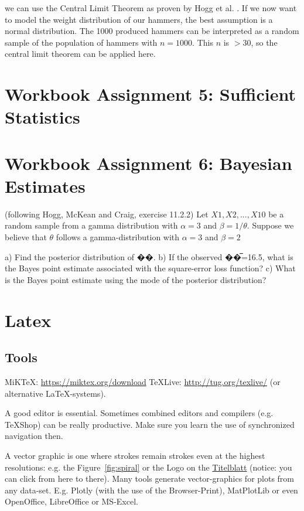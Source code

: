 we can use the Central Limit Theorem as proven by Hogg et al. \cite[Theorem~5.3.1]{hogg}. 
If we now want to model the weight distribution of our hammers, the best assumption is a normal distribution. The 1000 produced hammers can be interpreted as a random sample of the population of hammers with $n = 1000$. This $n$ is $>30$, so the central limit theorem can be applied here. 



\chapter{Workbook Assignment 5: Sufficient Statistics}	
\chapter{Workbook Assignment 6: Bayesian Estimates}	

(following Hogg, McKean and Craig, exercise 11.2.2)
Let $X1, X2, ... , X10$ be a random sample from a gamma distribution with $\alpha =3$ and $\beta =1/\theta$. Suppose we believe that $\theta$ follows a gamma-distribution with $\alpha =3$ and $\beta = 2$

a) Find the posterior distribution of ��.
b) If the observed ��̅=16.5, what is the Bayes point estimate associated with the square-error loss function?
c) What is the Bayes point estimate using the mode of the posterior distribution?





\chapter{Latex}

\section{Tools}

MiKTeX: \url{https://miktex.org/download}
TeXLive: \url{http://tug.org/texlive/}
 (or alternative LaTeX-systems).
 
 A good editor is essential. Sometimes combined editors and compilers (e.g. TeXShop) can be really productive. Make sure you learn the use of synchronized navigation then.

A vector graphic is one where strokes remain strokes even at the highest resolutions: e.g. the Figure~\ref{fig:spiral} or the Logo on the \hyperref[titlePage]{Titelblatt} (notice: you can click from here to there).
Many tools generate vector-graphics for plots from any data-set. E.g. Plotly (with the use of the Browser-Print), MatPlotLib or even OpenOffice, LibreOffice or MS-Excel.

